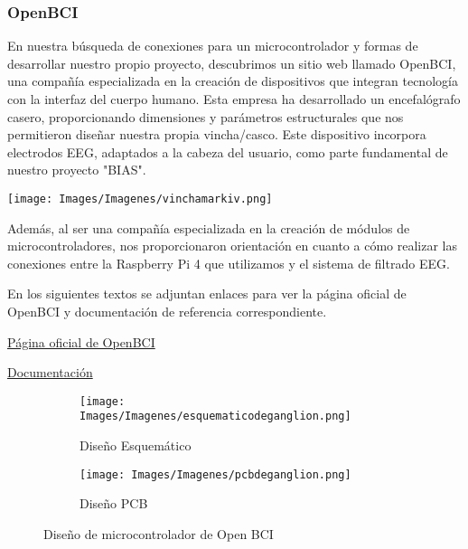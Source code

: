 \documentclass{article}
\begin{document}
\subsubsection{OpenBCI}

En nuestra búsqueda de conexiones para un microcontrolador y formas de desarrollar nuestro propio proyecto, descubrimos un sitio web llamado OpenBCI, una compañía especializada en la creación de dispositivos que integran tecnología con la interfaz del cuerpo humano. Esta empresa ha desarrollado un encefalógrafo casero, proporcionando dimensiones y parámetros estructurales que nos permitieron diseñar nuestra propia vincha/casco. Este dispositivo incorpora electrodos EEG, adaptados a la cabeza del usuario, como parte fundamental de nuestro proyecto "BIAS".

\begin{center}
    \texttt{[image: Images/Imagenes/vinchamarkiv.png]}\\
\end{center}

Además, al ser una compañía especializada en la creación de módulos de microcontroladores, nos proporcionaron orientación en cuanto a cómo realizar las conexiones entre la Raspberry Pi 4 que utilizamos y el sistema de filtrado EEG.

En los siguientes textos se adjuntan enlaces para ver la página oficial de OpenBCI y documentación de referencia correspondiente.

\begin{center}
    \href{https://openbci.com/}{Página oficial de OpenBCI}

    
    \href{https://docs.openbci.com/}{Documentación}

    
\end{center}

\begin{figure}[h!]
\centering

\begin{subfigure}[b]{0.45\linewidth}
    \texttt{[image: Images/Imagenes/esquematicodeganglion.png]}
    \caption{Diseño Esquemático}
    \label{fig:westminster_lateral}
\end{subfigure}

\begin{subfigure}[b]{0.45\linewidth}
\texttt{[image: Images/Imagenes/pcbdeganglion.png]}
\caption{Diseño PCB}
\label{fig:westminster_aerea}

\end{subfigure}
\caption{Diseño de microcontrolador de Open BCI}
\label{fig:westminster}
\end{figure}
\end{document}
